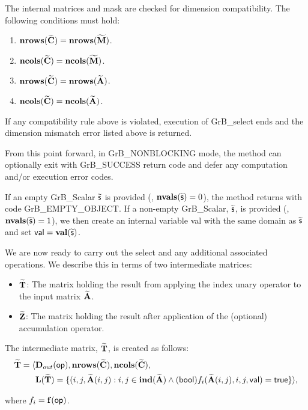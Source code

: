 The internal matrices and mask are checked for dimension compatibility. 
The following conditions must hold:
\begin{enumerate}
    \item $\bold{nrows}({\bf \widetilde{C}}) = \bold{nrows}({\bf \widetilde{M}})$.

    \item $\bold{ncols}({\bf \widetilde{C}}) = \bold{ncols}({\bf \widetilde{M}})$.

    \item $\bold{nrows}({\bf \widetilde{C}}) = \bold{nrows}({\bf \widetilde{A}})$.

    \item $\bold{ncols}({\bf \widetilde{C}}) = \bold{ncols}({\bf \widetilde{A}})$.
\end{enumerate}
If any compatibility rule above is violated, execution of {\sf GrB\_select} ends and 
the dimension mismatch error listed above is returned.

From this point forward, in {\sf GrB\_NONBLOCKING} mode, the method can optionally exit
with {\sf GrB\_SUCCESS} return code and defer any computation and/or execution error codes.

{\color{red}
If an empty {\sf GrB\_Scalar} $\widetilde{\sf s}$ is provided (\ie, $\mathbf{nvals}(\widetilde{\sf s}) = 0$),
the method returns with code {\sf GrB\_EMPTY\_OBJECT}. If a non-empty {\sf GrB\_Scalar}, 
$\widetilde{\sf s}$, is provided (\ie, $\mathbf{nvals}(\widetilde{\sf s}) = 1$), we then create an 
internal variable {\sf val} with the same domain as $\widetilde{\sf s}$ and set 
${\sf val} = \mathbf{val}(\widetilde{\sf s})$.
}

We are now ready to carry out the {\sf select} and any additional 
associated operations.  We describe this in terms of two intermediate matrices:
\begin{itemize}
    \item ${\bf \widetilde{T}}$: The matrix holding the result from applying the index unary operator to the input matrix
    ${\bf \widetilde{A}}$.

    \item ${\bf \widetilde{Z}}$: The matrix holding the result after 
    application of the (optional) accumulation operator.
\end{itemize}

{\color{red}
The intermediate matrix, ${\bf \widetilde{T}}$, is created as follows:
\[
\begin{aligned}
{\bf \widetilde{T}} = \langle & \mbox{$\mathbf{D}_{out}$}({\sf op}),
                           \bold{nrows}({\bf \widetilde{C}}), 
                           \bold{ncols}({\bf \widetilde{C}}), \\
						  & \bold{L}({\bf \widetilde{T}}) =
    \{(i,j,{\bf \widetilde{A}}(i,j) : {i,j} \in \bold{ind}({\bf \widetilde{A}}) 
	\wedge
({\sf bool})f_i({\bf \widetilde{A}}(i,j),i,j,{\sf val}) = {\sf true} \} \rangle, 
\end{aligned}
\]

where $f_i = \mathbf{f}({\sf op})$.
}




